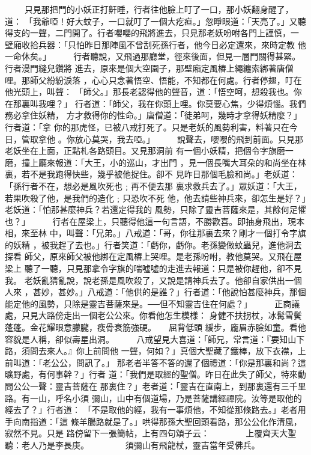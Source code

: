 \begin{pinyinscope}
{　　
只見那把門的小妖正打鼾睡，行者往他臉上叮了一口，那小妖翻身醒了，道：
「我爺啞！好大蚊子，一口就叮了一個大疙疸。」忽睜眼道：「天亮了。」又聽
得支的一聲，二門開了。行者嚶嚶的飛將進去，只見那老妖吩咐各門上謹慎，一
壁廂收拾兵器：「只怕昨日那陣風不曾刮死孫行者，他今日必定還來，來時定教
他一命休矣。」
　　
行者聽說，又飛過那廳堂，徑來後面，但見一層門關得甚緊。行者漫門縫兒鑽將
進去，原來是個大空園子，那壁廂定風樁上繩纏索綁著唐僧哩。那師父紛紛淚落
，心心只念著悟空、悟能，不知都在何處。行者停翅，叮在他光頭上，叫聲：
「師父。」那長老認得他的聲音，道：「悟空呵，想殺我也。你在那裏叫我哩？」
行者道：「師父，我在你頭上哩。你莫要心焦，少得煩惱。我們務必拿住妖精，
方才救得你的性命。」唐僧道：「徒弟呵，幾時才拿得妖精麼？」行者道：「拿
你的那虎怪，已被八戒打死了。只是老妖的風勢利害，料著只在今日，管取拿他
。你放心莫哭，我去啞。」
　　
說聲去，嚶嚶的飛到前面。只見那老妖坐在上面，正點札各路頭目。又見那洞前
有一個小妖精，把個令字旗磨一磨，撞上廳來報道：「大王，小的巡山，才出門
，見一個長嘴大耳朵的和尚坐在林裏，若不是我跑得快些，幾乎被他捉住。卻不
見昨日那個毛臉和尚。」老妖道：「孫行者不在，想必是風吹死也﹔再不便去那
裏求救兵去了。」眾妖道：「大王，若果吹殺了他，是我們的造化﹔只恐吹不死
他，他去請些神兵來，卻怎生是好？」老妖道：「怕那甚麼神兵？若還定得我的
風勢，只除了靈吉菩薩來是，其餘何足懼也？」
　　
行者在屋梁上，只聽得他這一句言語，不勝歡喜。即抽身飛出，現本相，來至林
中，叫聲：「兄弟。」八戒道：「哥，你往那裏去來？剛才一個打令字旗的妖精
，被我趕了去也。」行者笑道：「虧你，虧你。老孫變做蚊蟲兒，進他洞去探看
師父，原來師父被他綁在定風樁上哭哩。是老孫吩咐，教他莫哭。又飛在屋梁上
聽了一聽，只見那拿令字旗的喘噓噓的走進去報道：只是被你趕他，卻不見我。
老妖亂猜亂說，說老孫是風吹殺了，又說是請神兵去了。他卻自家供出一個人來
，甚妙，甚妙。」八戒道：「他供的是誰？」行者道：「他說怕甚麼神兵，那個
能定他的風勢，只除是靈吉菩薩來是。──但不知靈吉住在何處？」
　　
正商議處，只見大路傍走出一個老公公來。你看他怎生模樣：
身健不扶拐杖，冰髯雪鬢蓬蓬。金花耀眼意朦朧，瘦骨衰筋強硬。　　屈背低頭
緩步，龐眉赤臉如童。看他容貌是人稱，卻似壽星出洞。
　　
八戒望見大喜道：「師兄，常言道：『要知山下路，須問去來人。』你上前問他
一聲，何如？」真個大聖藏了鐵棒，放下衣襟，上前叫道：「老公公，問訊了。」
那老者半答不答的還了個禮道：「你是那裏和尚？這曠野處，有何事幹？」行者
道：「我們是取經的聖僧。昨日在此失了師父，特來動問公公一聲：靈吉菩薩在
那裏住？」老者道：「靈吉在直南上，到那裏還有三千里路。有一山，呼名小須
彌山，山中有個道場，乃是菩薩講經禪院。汝等是取他的經去了？」行者道：
「不是取他的經，我有一事煩他，不知從那條路去。」老者用手向南指道：「這
條羊腸路就是了。」哄得那孫大聖回頭看路，那公公化作清風，寂然不見。只是
路傍留下一張簡帖，上有四句頌子云：
　　　　上覆齊天大聖聽：老人乃是李長庚。
　　　　須彌山有飛龍杖，靈吉當年受佛兵。

}
\end{pinyinscope}
